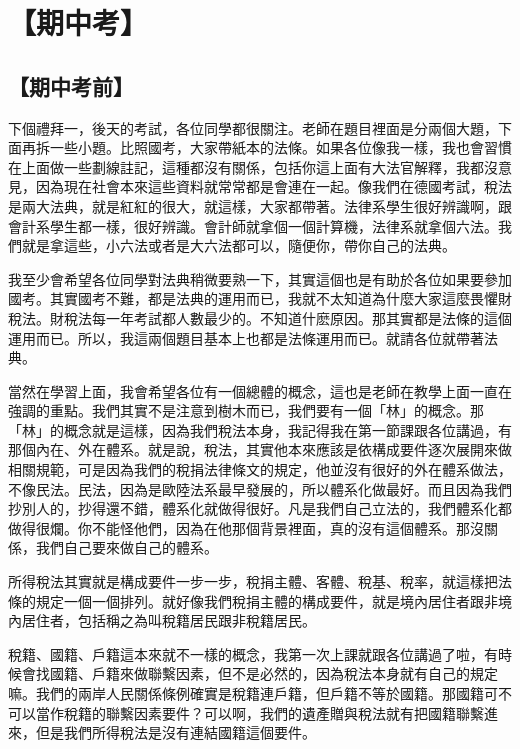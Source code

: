 \documentclass[oneside,sub3section]{ctexbook}
\begin{document}
\hypertarget{ux671fux4e2dux8003}{%
\chapter{【期中考】}\label{ux671fux4e2dux8003}}

\hypertarget{ux671fux4e2dux8003ux524d}{%
\section{【期中考前】}\label{ux671fux4e2dux8003ux524d}}

下個禮拜一，後天的考試，各位同學都很關注。老師在題目裡面是分兩個大題，下面再拆一些小題。比照國考，大家帶紙本的法條。如果各位像我一樣，我也會習慣在上面做一些劃線註記，這種都沒有關係，包括你這上面有大法官解釋，我都沒意見，因為現在社會本來這些資料就常常都是會連在一起。像我們在德國考試，稅法是兩大法典，就是紅紅的很大，就這樣，大家都帶著。法律系學生很好辨識啊，跟會計系學生都一樣，很好辨識。會計師就拿個一個計算機，法律系就拿個六法。我們就是拿這些，小六法或者是大六法都可以，隨便你，帶你自己的法典。

我至少會希望各位同學對法典稍微要熟一下，其實這個也是有助於各位如果要參加國考。其實國考不難，都是法典的運用而已，我就不太知道為什麼大家這麼畏懼財稅法。財稅法每一年考試都人數最少的。不知道什麽原因。那其實都是法條的這個運用而已。所以，我這兩個題目基本上也都是法條運用而已。就請各位就帶著法典。

當然在學習上面，我會希望各位有一個總體的概念，這也是老師在教學上面一直在強調的重點。我們其實不是注意到樹木而已，我們要有一個「林」的概念。那「林」的概念就是這樣，因為我們稅法本身，我記得我在第一節課跟各位講過，有那個內在、外在體系。就是說，稅法，其實他本來應該是依構成要件逐次展開來做相關規範，可是因為我們的稅捐法律條文的規定，他並沒有很好的外在體系做法，不像民法。民法，因為是歐陸法系最早發展的，所以體系化做最好。而且因為我們抄別人的，抄得還不錯，體系化就做得很好。凡是我們自己立法的，我們體系化都做得很爛。你不能怪他們，因為在他那個背景裡面，真的沒有這個體系。那沒關係，我們自己要來做自己的體系。

所得稅法其實就是構成要件一步一步，稅捐主體、客體、稅基、稅率，就這樣把法條的規定一個一個排列。就好像我們稅捐主體的構成要件，就是境內居住者跟非境內居住者，包括稱之為叫稅籍居民跟非稅籍居民。

稅籍、國籍、戶籍這本來就不一樣的概念，我第一次上課就跟各位講過了啦，有時候會找國籍、戶籍來做聯繫因素，但不是必然的，因為稅法本身就有自己的規定嘛。我們的兩岸人民關係條例確實是稅籍連戶籍，但戶籍不等於國籍。那國籍可不可以當作稅籍的聯繫因素要件？可以啊，我們的遺產贈與稅法就有把國籍聯繫進來，但是我們所得稅法是沒有連結國籍這個要件。
\end{document}
